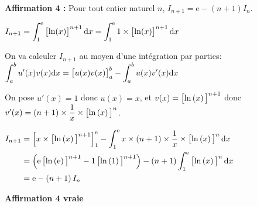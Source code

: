 \documentclass[10pt]{article}
\providecommand{\e}{{\mathrm{e}}}
\renewcommand{\d}{{\mathrm{d}}}
\providecommand{\ds}{\displaystyle}
\begin{document}
\begin{enumerate}
\textbf{Affirmation 4 :} Pour tout entier naturel $n$, $I_{n+1} = \e - (n + 1) I_n$.

\medskip

$I_{n+1} = \displaystyle\int_1^{\e} \left [\ln (x)\strut \right ]^{n+1}\d x
= \displaystyle\int_1^{\e} 1\times \left [\ln (x)\strut\right ]^{n+1}\d x$

On va calculer $I_{n+1}$ au moyen d'une intégration par parties:\\
$\ds\int_{a}^{b} u'(x)v(x) \d x = \left [u(x) v(x)\strut \right ]_{a}^{b} - \ds\int_{a}^{b} u(x) v'(x) \d x$

On pose $u'(x)=1$ donc $u(x)=x$, et $v(x)= \left [\ln\left (x\right )\strut\right] ^{n+1}$ donc
$v'(x)=\left (n+1\right ) \times \dfrac{1}{x} \times \left [\ln\left (x\right )\strut\right ]^n$.

$\begin{aligned}[t]
I_{n+1} & =  \left [ x\times \left [\ln\left (x\right )\strut\right ]^{n+1}\right ]_{1}^{\e}
 - \ds\int_{1}^{\e} x\times (n+1) \times \dfrac{1}{x} \times \left [ \ln\left (x\right )\strut \right ]^n \d x\\
 & = \left ( \e \left [ \ln \left (\e\right )\strut \right ]^{n+1} - 1 \left [ \ln \left (1\right )\strut \right ]^{n+1}\right ) - \left (n+1\right ) \ds\int_{1}^{\e} \left [\ln\left (x\right )\strut\right ]^{n} \d x\\
&  = \e - \left (n+1\right ) I_n
 \end{aligned}$

\hfill \textbf{Affirmation 4 vraie}
\end{enumerate}

\vspace{0,5cm}
\end{document}
